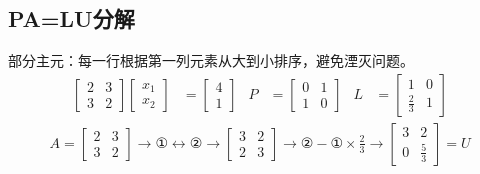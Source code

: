 \documentclass[twocolumn]{article}
\begin{document}
\subsection{PA=LU分解}
部分主元：每一行根据第一列元素从大到小排序，避免湮灭问题。
\begin{align*}
    \begin{bmatrix}
        2 & 3 \\
        3 & 2
    \end{bmatrix}
    \begin{bmatrix}
        x_1 \\
        x_2
    \end{bmatrix}
     & =
    \begin{bmatrix}
        4 \\
        1
    \end{bmatrix}
     & P & =
    \begin{bmatrix}
        0 & 1 \\
        1 & 0
    \end{bmatrix}
     & L & =
    \begin{bmatrix}
        1           & 0 \\
        \frac{2}{3} & 1
    \end{bmatrix}
\end{align*}
\begin{align*}
    A=
    \begin{bmatrix}
        2 & 3 \\
        3 & 2
    \end{bmatrix}
    \rightarrow ① \leftrightarrow ② \rightarrow
    \begin{bmatrix}
        3 & 2 \\
        2 & 3
    \end{bmatrix}
    \rightarrow ②-①\times\frac{2}{3}\rightarrow
    \begin{bmatrix}
        3 & 2           \\
        0 & \frac{5}{3}
    \end{bmatrix}
    =U
\end{align*}
\end{document}
